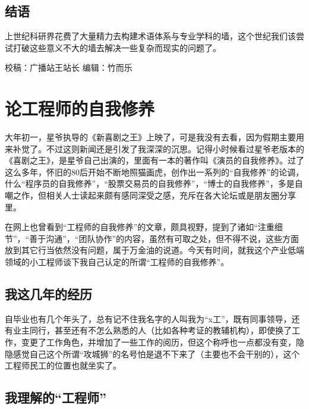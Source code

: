\documentclass[]{book}
\begin{document}
\hypertarget{ux7ed3ux8bed-1}{%
\subsection{结语}\label{ux7ed3ux8bed-1}}

上世纪科研界花费了大量精力去构建术语体系与专业学科的墙，这个世纪我们该尝试打破这些意义不大的墙去解决一些复杂而现实的问题了。

校稿：广播站王站长
编辑：竹而乐

\hypertarget{ux8bbaux5de5ux7a0bux5e08ux7684ux81eaux6211ux4feeux517b}{%
\section{论工程师的自我修养}\label{ux8bbaux5de5ux7a0bux5e08ux7684ux81eaux6211ux4feeux517b}}

大年初一，星爷执导的《新喜剧之王》上映了，可是我没有去看，因为假期主要用来补觉了。不过这则新闻还是引发了我深深的沉思。记得小时候看过星爷老版本的《喜剧之王》，是星爷自己出演的，里面有一本的著作叫《演员的自我修养》。过了这么多年，怀旧的80后开始不断地照猫画虎，创作出一系列的``自我修养''的论调，什么``程序员的自我修养''，``股票交易员的自我修养''，``博士的自我修养''，多是自嘲之作，但相关人士读起来颇有感同深受之感，充斥在各大论坛或是朋友圈分享里。

在网上也曾看到``工程师的自我修养''的文章，颇具视野，提到了诸如``注重细节''，``善于沟通''，``团队协作''的内容，虽然有可取之处，但不得不说，这些方面放到其它行当依然没有问题，属于万金油的说道。今天有时间，就我这个产业低端领域的小工程师谈下我自己认定的所谓``工程师的自我修养''。

\hypertarget{ux6211ux8fd9ux51e0ux5e74ux7684ux7ecfux5386}{%
\subsection{我这几年的经历}\label{ux6211ux8fd9ux51e0ux5e74ux7684ux7ecfux5386}}

自毕业也有几个年头了，总有记不住我名字的人叫我为``x工''，既有同事领导，还有业主同行，甚至还有不怎么熟悉的人（比如各种考证的教辅机构），即使换了工作，变更了工作角色，并增加了一些工作的阅历，但这个称呼也一点都没有变，隐隐感觉自己这个所谓``攻城狮''的名号怕是退不下来了（主要也不会干别的），这个工程师民工的位置也就坐实了。

\hypertarget{ux6211ux7406ux89e3ux7684ux5de5ux7a0bux5e08}{%
\subsection{我理解的``工程师''}\label{ux6211ux7406ux89e3ux7684ux5de5ux7a0bux5e08}}
\end{document}
